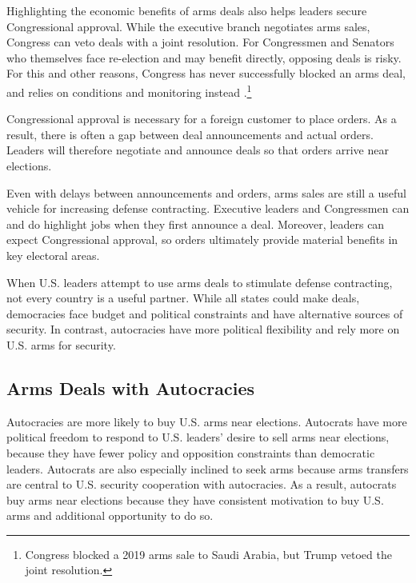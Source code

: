 \documentclass[12pt]{article}
\begin{document}
Highlighting the economic benefits of arms deals also helps leaders secure Congressional approval. 
While the executive branch negotiates arms sales, Congress can veto deals with a joint resolution. 
For Congressmen and Senators who themselves face re-election and may benefit directly, opposing deals is risky.
For this and other reasons, Congress has never successfully blocked an arms deal, and relies on conditions and monitoring instead \citep{Thralletal2020}.\footnote{Congress blocked a 2019 arms sale to Saudi Arabia, but Trump vetoed the joint resolution.}


Congressional approval is necessary for a foreign customer to place orders. 
As a result, there is often a gap between deal announcements and actual orders.
Leaders will therefore negotiate and announce deals so that orders arrive near elections.  


Even with delays between announcements and orders, arms sales are still a useful vehicle for increasing defense contracting. 
Executive leaders and Congressmen can and do highlight jobs when they first announce a deal. 
Moreover, leaders can expect Congressional approval, so orders ultimately provide material benefits in key electoral areas. 


When U.S. leaders attempt to use arms deals to stimulate defense contracting, not every country is a useful partner. 
While all states could make deals, democracies face budget and political constraints and have alternative sources of security.
In contrast, autocracies have more political flexibility and rely more on U.S. arms for security.



\subsection{Arms Deals with Autocracies}


Autocracies are more likely to buy U.S. arms near elections. 
Autocrats have more political freedom to respond to U.S. leaders' desire to sell arms near elections, because they have fewer policy and opposition constraints than democratic leaders. 
Autocrats are also especially inclined to seek arms because arms transfers are central to U.S. security cooperation with autocracies.
As a result, autocrats buy arms near elections because they have consistent motivation to buy U.S. arms and additional opportunity to do so. 
\end{document}
